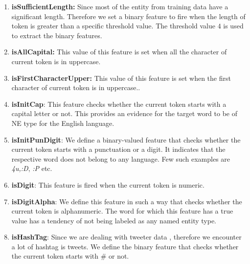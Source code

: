 \documentclass[11pt,a4paper]{article}
\begin{document}
\begin{enumerate}
\begin{enumerate}
\item \textbf{isSufficientLength:} Since most of the entity from training data have a significant length. Therefore we set a binary feature to fire when the length of token is greater than a specific threshold value. The threshold value $4$ is used to extract the binary features. 
\item \textbf{isAllCapital:} This value of this feature is set when all the character of current token is in uppercase.
\item \textbf{isFirstCharacterUpper:} This value of this feature is set when the first character of current token is in uppercase..
\item \textbf{isInitCap}: This feature checks whether the current token starts with a capital letter or not. This provides an evidence for the target word to be of NE type for the English language. 
\item \textbf{isInitPunDigit}: We define a binary-valued feature that checks whether the current token starts with a punctuation or a digit. It indicates that the respective word does not belong to any language. Few such examples are \textit{4u,:D}, \textit{:P} etc. 
\item \textbf{isDigit}: This feature is fired when the current token is numeric. 
\item \textbf{isDigitAlpha}: We define this feature in such a way that checks whether the current token is alphanumeric. The word for which this feature has a true value has a tendency of not being labeled as any named entity type. 
\item \textbf{isHashTag}: Since we are dealing with tweeter data , therefore we encounter a lot of hashtag is tweets. We define the binary feature that checks whether the current token starts with \# or not.
\end{enumerate}

\end{enumerate}
\end{document}
